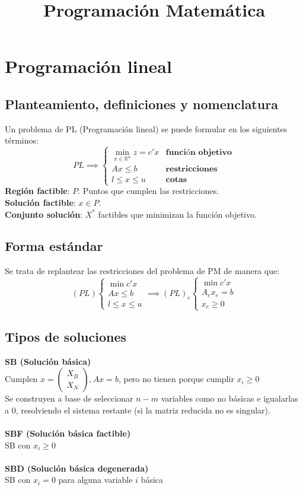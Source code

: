 \documentclass[leqno]{article}
\title{Programación Matemática}
\begin{document}
\maketitle
\tableofcontents
\newpage

\section{Programación lineal}
\subsection{Planteamiento, definiciones y nomenclatura}
Un problema de PL (Programación lineal) se puede formular en los siguientes términos:
$$ PL \implies 
\begin{cases}
\min_{x\in \mathbb{R}^n} z = c'x & \textbf{función objetivo} \\
Ax\leq b & \textbf{restricciones}  \\
l\leq x\leq u & \textbf{cotas} 
\end{cases}
$$
\textbf{Región factible}: $P$. Puntos que cumplen las restricciones. \\
\textbf{Solución factible}: $x\in P$. \\
\textbf{Conjunto solución}: $X^*$ factibles que minimizan la función objetivo. \\

\subsection{Forma estándar}
Se trata de replantear las restricciones del problema de PM de manera que:
$$
(PL)
\begin{cases}
    \min c'x \\
    Ax\leq b \\
    l\leq x\leq u
\end{cases}
\implies
(PL)_e
\begin{cases}
    \min c'x \\
    A_ex_e= b \\
    x_e\geq 0
\end{cases}
$$
\subsection{Tipos de soluciones}
\textbf{SB (Solución básica)} \\
Cumplen $x=\begin{pmatrix} X_B\\X_N \end{pmatrix}, Ax=b$, pero no tienen porque cumplir $x_i\geq 0$\\
Se construyen a base de seleccionar $n-m$ variables como no básicas e igualarlas a 0, resolviendo el sistema restante (si la matriz reducida no es singular).\\
\\
\textbf{SBF (Solución básica factible)} \\
SB con $x_i\geq 0$ \\
\\
\textbf{SBD (Solución básica degenerada)} \\
SB con $x_i = 0$ para alguna variable $i$ básica \\
\end{document}
